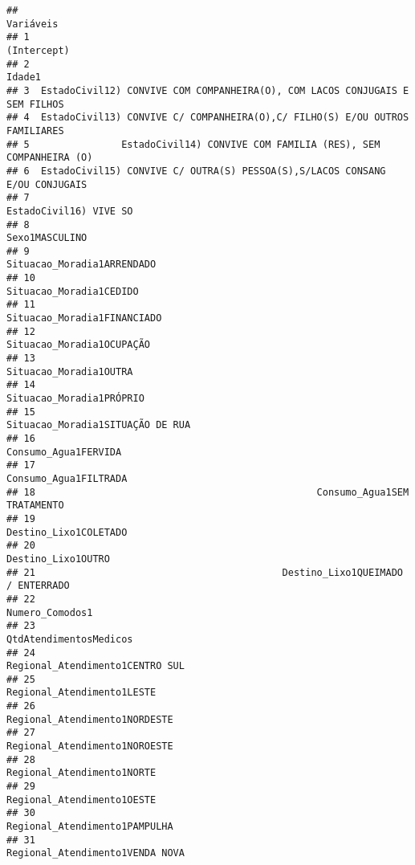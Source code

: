 \documentclass[
]{article}
\begin{document}
\begin{verbatim}
##                                                                      Variáveis
## 1                                                                  (Intercept)
## 2                                                                       Idade1
## 3  EstadoCivil12) CONVIVE COM COMPANHEIRA(O), COM LACOS CONJUGAIS E SEM FILHOS
## 4  EstadoCivil13) CONVIVE C/ COMPANHEIRA(O),C/ FILHO(S) E/OU OUTROS FAMILIARES
## 5                EstadoCivil14) CONVIVE COM FAMILIA (RES), SEM COMPANHEIRA (O)
## 6  EstadoCivil15) CONVIVE C/ OUTRA(S) PESSOA(S),S/LACOS CONSANG E/OU CONJUGAIS
## 7                                                       EstadoCivil16) VIVE SO
## 8                                                               Sexo1MASCULINO
## 9                                                   Situacao_Moradia1ARRENDADO
## 10                                                     Situacao_Moradia1CEDIDO
## 11                                                 Situacao_Moradia1FINANCIADO
## 12                                                   Situacao_Moradia1OCUPAÇÃO
## 13                                                      Situacao_Moradia1OUTRA
## 14                                                    Situacao_Moradia1PRÓPRIO
## 15                                            Situacao_Moradia1SITUAÇÃO DE RUA
## 16                                                        Consumo_Agua1FERVIDA
## 17                                                       Consumo_Agua1FILTRADA
## 18                                                 Consumo_Agua1SEM TRATAMENTO
## 19                                                       Destino_Lixo1COLETADO
## 20                                                          Destino_Lixo1OUTRO
## 21                                           Destino_Lixo1QUEIMADO / ENTERRADO
## 22                                                             Numero_Comodos1
## 23                                                      QtdAtendimentosMedicos
## 24                                             Regional_Atendimento1CENTRO SUL
## 25                                                  Regional_Atendimento1LESTE
## 26                                               Regional_Atendimento1NORDESTE
## 27                                               Regional_Atendimento1NOROESTE
## 28                                                  Regional_Atendimento1NORTE
## 29                                                  Regional_Atendimento1OESTE
## 30                                               Regional_Atendimento1PAMPULHA
## 31                                             Regional_Atendimento1VENDA NOVA

\end{verbatim}
\end{document}
